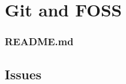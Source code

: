 \documentclass[12pt]{article}
\begin{document}
\section{Git and FOSS}

\subsubsection{README.md}

\subsection{Issues}
\end{document}
